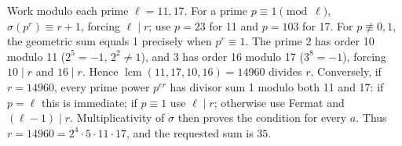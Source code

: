 Work modulo each prime $\ell=11,17$. For a prime $p\equiv1\pmod\ell$, $\sigma(p^r)\equiv r+1$, forcing $\ell\mid r$; use $p=23$ for 11 and $p=103$ for 17. For $p\not\equiv0,1$, the geometric sum equals 1 precisely when $p^r\equiv1$. The prime 2 has order 10 modulo 11 ($2^5=-1$, $2^2\ne1$), and 3 has order 16 modulo 17 ($3^8=-1$), forcing $10\mid r$ and $16\mid r$. Hence $\operatorname{lcm}(11,17,10,16)=14960$ divides $r$. Conversely, if $r=14960$, every prime power $p^{er}$ has divisor sum 1 modulo both 11 and 17: if $p=\ell$ this is immediate; if $p\equiv1$ use $\ell\mid r$; otherwise use Fermat and $(\ell-1)\mid r$. Multiplicativity of $\sigma$ then proves the condition for every $a$. Thus $r=14960=2^4\cdot5\cdot11\cdot17$, and the requested sum is $\boxed{35}$.
